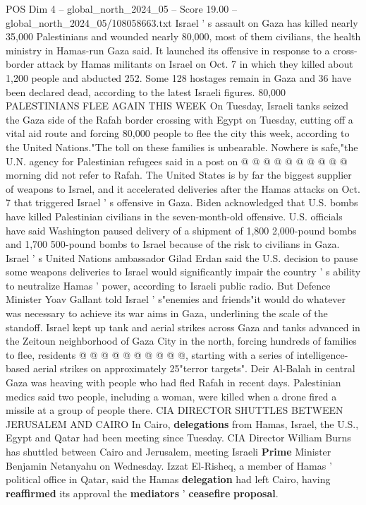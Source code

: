 \begin{textsample}{POS Dim 4 – global\_north\_2024\_05 – Score 19.00 – global\_north\_2024\_05/108058663.txt}
Israel ' s assault on Gaza has killed nearly 35,000 Palestinians and wounded nearly 80,000, most of them civilians, the health ministry in Hamas-run Gaza said.
It launched its offensive in response to a cross-border attack by Hamas militants on Israel on Oct. 7 in which they killed about 1,200 people and abducted 252.
Some 128 hostages remain in Gaza and 36 have been declared dead, according to the latest Israeli figures. 80,000 PALESTINIANS FLEE AGAIN THIS WEEK On Tuesday, Israeli tanks seized the Gaza side of the Rafah border crossing with Egypt on Tuesday, cutting off a vital aid route and forcing 80,000 people to flee the city this week, according to the United Nations."The toll on these families is unbearable.
Nowhere is safe,"the U.N. agency for Palestinian refugees said in a post on @ @ @ @ @ @ @ @ @ @ morning did not refer to Rafah.
The United States is by far the biggest supplier of weapons to Israel, and it accelerated deliveries after the Hamas attacks on Oct. 7 that triggered Israel ' s offensive in Gaza.
Biden acknowledged that U.S. bombs have killed Palestinian civilians in the seven-month-old offensive.
U.S. officials have said Washington paused delivery of a shipment of 1,800 2,000-pound bombs and 1,700 500-pound bombs to Israel because of the risk to civilians in Gaza.
Israel ' s United Nations ambassador Gilad Erdan said the U.S. decision to pause some weapons deliveries to Israel would significantly impair the country ' s ability to neutralize Hamas ' power, according to Israeli public radio.
But Defence Minister Yoav Gallant told Israel ' s"enemies and friends"it would do whatever was necessary to achieve its war aims in Gaza, underlining the scale of the standoff.
Israel kept up tank and aerial strikes across Gaza and tanks advanced in the Zeitoun neighborhood of Gaza City in the north, forcing hundreds of families to flee, residents @ @ @ @ @ @ @ @ @ @, starting with a series of intelligence-based aerial strikes on approximately 25"terror targets".
Deir Al-Balah in central Gaza was heaving with people who had fled Rafah in recent days.
Palestinian medics said two people, including a woman, were killed when a drone fired a missile at a group of people there.
CIA DIRECTOR SHUTTLES BETWEEN JERUSALEM AND CAIRO In Cairo, \textbf{delegations} from Hamas, Israel, the U.S., Egypt and Qatar had been meeting since Tuesday.
CIA Director William Burns has shuttled between Cairo and Jerusalem, meeting Israeli \textbf{Prime} Minister Benjamin Netanyahu on Wednesday.
Izzat El-Risheq, a member of Hamas ' political office in Qatar, said the Hamas \textbf{delegation} had left Cairo, having \textbf{reaffirmed} its approval the \textbf{mediators} ' \textbf{ceasefire} \textbf{proposal}.

\end{textsample}
